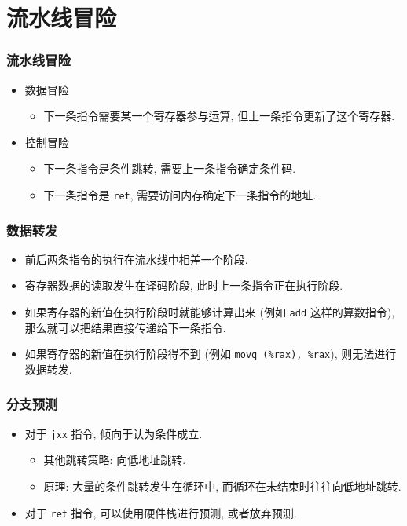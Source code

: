 \documentclass{ctexbeamer}
\newcommand{\ftitle}[1]{\frametitle{\hspace{4ex} {#1}}}
\begin{document}
\section{流水线冒险}
\begin{frame}
    \ftitle{流水线冒险}
    \begin{itemize}
        \item<2- > 数据冒险
              \begin{itemize}
                  \item<3- > 下一条指令需要某一个寄存器参与运算, 但上一条指令更新了这个寄存器.
              \end{itemize}
        \item<4- > 控制冒险
              \begin{itemize}
                  \item<5- > 下一条指令是条件跳转, 需要上一条指令确定条件码.
                  \item<6- > 下一条指令是 \texttt{ret}, 需要访问内存确定下一条指令的地址.
              \end{itemize}
    \end{itemize}
\end{frame}

\begin{frame}
    \ftitle{数据转发}
    \begin{itemize}
        \item<2- > 前后两条指令的执行在流水线中相差一个阶段.
        \item<3- > 寄存器数据的读取发生在译码阶段, 此时上一条指令正在执行阶段.
        \item<4- > 如果寄存器的新值在执行阶段时就能够计算出来
              (例如 \texttt{add} 这样的算数指令),
              那么就可以把结果直接传递给下一条指令.
        \item<5- > 如果寄存器的新值在执行阶段得不到
              (例如 \texttt{movq (\%rax), \%rax}),
              则无法进行数据转发.
    \end{itemize}
\end{frame}

\begin{frame}
    \ftitle{分支预测}
    \begin{itemize}
        \item<2- > 对于 \texttt{jxx} 指令, 倾向于认为条件成立.
              \begin{itemize}
                  \item<3- > 其他跳转策略: 向低地址跳转.
                  \item<4- > 原理: 大量的条件跳转发生在循环中, 而循环在未结束时往往向低地址跳转.
              \end{itemize}
        \item<5- > 对于 \texttt{ret} 指令, 可以使用硬件栈进行预测, 或者放弃预测.
    \end{itemize}
\end{frame}
\end{document}
